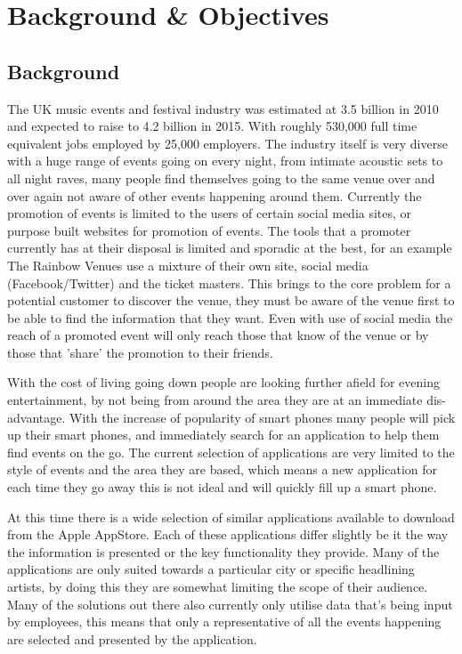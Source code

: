 \chapter{Background \& Objectives}

\section{Background}

	The UK music events and festival industry was estimated at 3.5 billion in 2010 and expected to raise to 4.2 billion in 2015. With roughly 530,000 full time equivalent jobs employed by 25,000 employers.\cite{eventStats} The industry itself is very diverse with a huge range of events going on every night, from intimate acoustic sets to all night  raves, many people find themselves going to the same venue over and over again not aware of other events happening around them. Currently the promotion of events is limited to the users of certain social media sites, or purpose built websites for promotion of events. The tools that a promoter currently has at their disposal is limited and sporadic at the best, for an example The Rainbow Venues\cite{theRainbow} use a mixture of their own site, social media (Facebook/Twitter) and the ticket masters. This brings to the core problem for a potential customer to discover the venue, they must be aware of the venue first to be able to find the information that they want. Even with use of social media the reach of a promoted event will only reach those that know of the venue or by those that 'share' the promotion to their friends. 

	With the cost of living going down people are looking further afield for evening entertainment, by not being from around the area they are at an immediate dis-advantage. With the increase of popularity of smart phones many people will pick up their smart phones, and immediately search for an application to help them find events on the go. The current selection of applications are very limited to the style of events and the area they are based, which means a new application for each time they go away this is not ideal and will quickly fill up a smart phone. 

	At this time there is a wide selection of similar applications available to download from the Apple AppStore. Each of these applications differ slightly be it the way the information is presented or the key functionality they provide. Many of the applications are only suited towards a particular city or specific headlining artists, by doing this they are somewhat limiting the scope of their audience. Many of the solutions out there also currently only utilise data that's being input by employees, this means that only a representative of all the events happening are selected and presented by the application. 


